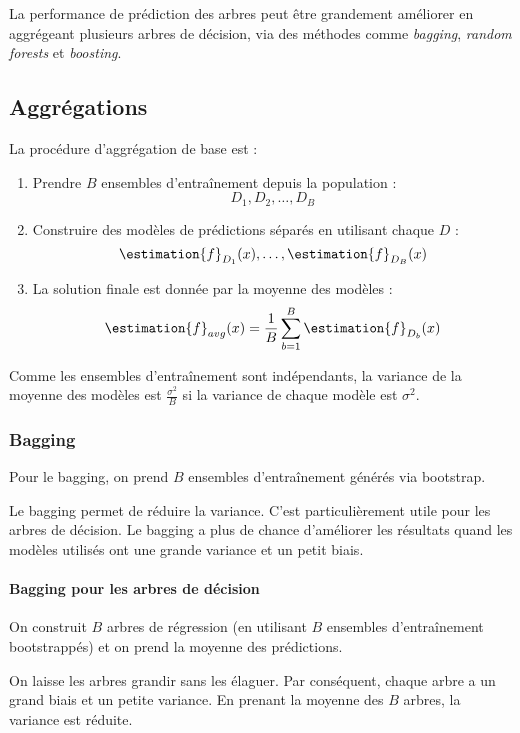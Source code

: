         La performance de prédiction des arbres peut être grandement améliorer en aggrégeant plusieurs arbres de décision, via des méthodes comme \textit{bagging}, \textit{random forests} et \textit{boosting}.

    \subsection{Aggrégations}
        La procédure d'aggrégation de base est :
        \begin{enumerate}
            \item Prendre \(B\) ensembles d'entraînement depuis la population :
            \[
                D_1, D_2, \dots, D_B
            \]
            \item Construire des modèles de prédictions séparés en utilisant chaque \(D\) :
            \[
                \estimation{f}_{D_1}(x), \dots, \estimation{f}_{D_B}(x)
            \]
            \item La solution finale est donnée par la moyenne des modèles :
            \[
                \estimation{f}_{avg}(x) = \frac{1}{B} \sum_{b = 1}^B \estimation{f}_{D_b} (x)
            \]
        \end{enumerate}

        Comme les ensembles d'entraînement sont indépendants, la variance de la moyenne des modèles est \(\frac{\sigma^2}{B}\) si la variance de chaque modèle est \(\sigma^2\).

        \subsubsection{Bagging}
            Pour le bagging, on prend \(B\) ensembles d'entraînement générés via bootstrap.

            Le bagging permet de réduire la variance. C'est particulièrement utile pour les arbres de décision. Le bagging a plus de chance d'améliorer les résultats quand les modèles utilisés ont une grande variance et un petit biais.

            \paragraph{Bagging pour les arbres de décision}
                On construit \(B\) arbres de régression (en utilisant \(B\) ensembles d'entraînement bootstrappés) et on prend la moyenne des prédictions.

                On laisse les arbres grandir sans les élaguer. Par conséquent, chaque arbre a un grand biais et un petite variance. En prenant la moyenne des \(B\) arbres, la variance est réduite.

